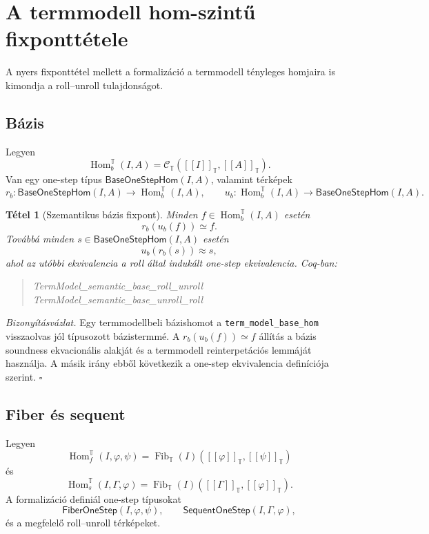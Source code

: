 \documentclass[11pt]{article}
\newtheorem{theorem}{Tétel}
\newenvironment{proofsketch}
  {\par\noindent\textit{Bizonyításvázlat.}}
  {\hfill$\square$\par}
\newenvironment{coqblock}
  {\begin{quote}\small\ttfamily\obeylines}
  {\end{quote}}
\newcommand{\TM}{\mathbb{T}}
\newcommand{\Hom}{\operatorname{Hom}}
\newcommand{\Fib}{\operatorname{Fib}}
\newcommand{\sem}[1]{[\![#1]\!]}
\begin{document}
\section{A termmodell hom-szintű fixponttétele}

A nyers fixponttétel mellett a formalizáció a termmodell tényleges homjaira
is kimondja a roll--unroll tulajdonságot.

\subsection{Bázis}

Legyen
\[
  \Hom_b^{\TM}(I,A)
  =
  \mathcal C_{\TM}(\sem I_{\TM},\sem A_{\TM}).
\]
Van egy one-step típus $\mathsf{BaseOneStepHom}(I,A)$, valamint térképek
\[
  r_b:\mathsf{BaseOneStepHom}(I,A)\to \Hom_b^{\TM}(I,A),
  \qquad
  u_b:\Hom_b^{\TM}(I,A)\to \mathsf{BaseOneStepHom}(I,A).
\]

\begin{theorem}[Szemantikus bázis fixpont]
Minden $f\in \Hom_b^{\TM}(I,A)$ esetén
\[
  r_b(u_b(f))\simeq f.
\]
Továbbá minden $s\in \mathsf{BaseOneStepHom}(I,A)$ esetén
\[
  u_b(r_b(s))\approx s,
\]
ahol az utóbbi ekvivalencia a roll által indukált one-step ekvivalencia.
Coq-ban:
\begin{coqblock}
TermModel\_semantic\_base\_roll\_unroll
TermModel\_semantic\_base\_unroll\_roll
\end{coqblock}
\end{theorem}

\begin{proofsketch}
Egy termmodellbeli bázishomot a \texttt{term\_model\_base\_hom}
visszaolvas jól típusozott bázistermmé. A
$r_b(u_b(f))\simeq f$ állítás a bázis soundness ekvacionális alakját és a
termmodell reinterpetációs lemmáját használja. A másik irány ebből következik
a one-step ekvivalencia definíciója szerint.
\end{proofsketch}

\subsection{Fiber és sequent}

Legyen
\[
  \Hom_f^{\TM}(I,\varphi,\psi)
  =
  \Fib_{\TM}(I)(\sem\varphi_{\TM},\sem\psi_{\TM})
\]
és
\[
  \Hom_s^{\TM}(I,\Gamma,\varphi)
  =
  \Fib_{\TM}(I)(\sem\Gamma_{\TM},\sem\varphi_{\TM}).
\]
A formalizáció definiál one-step típusokat
\[
  \mathsf{FiberOneStep}(I,\varphi,\psi),
  \qquad
  \mathsf{SequentOneStep}(I,\Gamma,\varphi),
\]
és a megfelelő roll--unroll térképeket.
\end{document}
